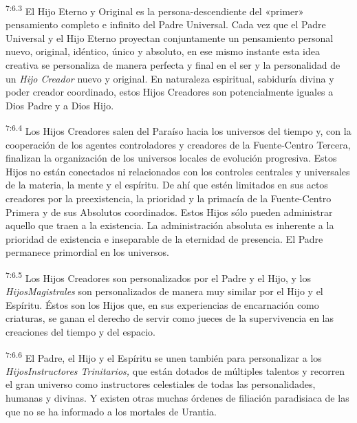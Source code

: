 \par
\textsuperscript{7:6.3} El Hijo Eterno y Original es la persona-descendiente del «primer» pensamiento completo e infinito del Padre Universal. Cada vez que el Padre Universal y el Hijo Eterno proyectan conjuntamente un pensamiento personal nuevo, original, idéntico, único y absoluto, en ese mismo instante esta idea creativa se personaliza de manera perfecta y final en el ser y la personalidad de un \textit{Hijo Creador} nuevo y original. En naturaleza espiritual, sabiduría divina y poder creador coordinado, estos Hijos Creadores son potencialmente iguales a Dios Padre y a Dios Hijo.

\par
\textsuperscript{7:6.4} Los Hijos Creadores salen del Paraíso hacia los universos del tiempo y, con la cooperación de los agentes controladores y creadores de la Fuente-Centro Tercera, finalizan la organización de los universos locales de evolución progresiva. Estos Hijos no están conectados ni relacionados con los controles centrales y universales de la materia, la mente y el espíritu. De ahí que estén limitados en sus actos creadores por la preexistencia, la prioridad y la primacía de la Fuente-Centro Primera y de sus Absolutos coordinados. Estos Hijos sólo pueden administrar aquello que traen a la existencia. La administración absoluta es inherente a la prioridad de existencia e inseparable de la eternidad de presencia. El Padre permanece primordial en los universos.

\par
\textsuperscript{7:6.5} Los Hijos Creadores son personalizados por el Padre y el Hijo, y los \textit{HijosMagistrales} son personalizados de manera muy similar por el Hijo y el Espíritu. Éstos son los Hijos que, en sus experiencias de encarnación como criaturas, se ganan el derecho de servir como jueces de la supervivencia en las creaciones del tiempo y del espacio.

\par
\textsuperscript{7:6.6} El Padre, el Hijo y el Espíritu se unen también para personalizar a los \textit{HijosInstructores Trinitarios,} que están dotados de múltiples talentos y recorren el gran universo como instructores celestiales de todas las personalidades, humanas y divinas. Y existen otras muchas órdenes de filiación paradisiaca de las que no se ha informado a los mortales de Urantia.

